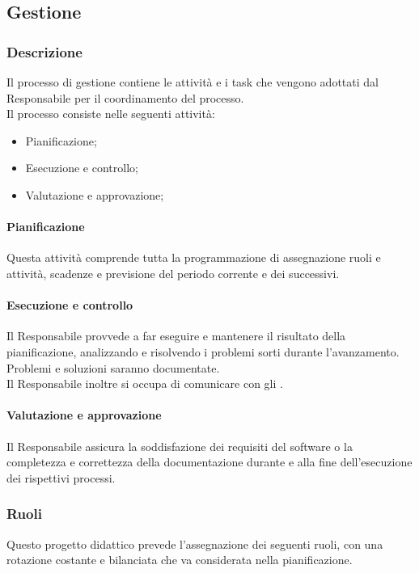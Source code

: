 \subsection{Gestione}

\subsubsection{Descrizione}
Il processo di gestione contiene le attività e i task che vengono adottati dal Responsabile per il coordinamento del processo.\\
Il processo consiste nelle seguenti attività:
\begin{itemize}
  \item Pianificazione;
  \item Esecuzione e controllo;
  \item Valutazione e approvazione;
\end{itemize}

\paragraph{Pianificazione}
Questa attività comprende tutta la programmazione di assegnazione ruoli e attività, scadenze e previsione del periodo corrente e dei successivi.

\paragraph{Esecuzione e controllo}
Il Responsabile provvede a far eseguire e mantenere il risultato della pianificazione, analizzando e risolvendo i problemi sorti durante l'avanzamento. Problemi e soluzioni saranno documentate.\\
Il Responsabile inoltre si occupa di comunicare con gli .

\paragraph{Valutazione e approvazione}
Il Responsabile assicura la soddisfazione dei requisiti del software o la completezza e correttezza della documentazione durante e alla fine dell'esecuzione dei rispettivi processi.

\subsubsection{Ruoli}
Questo progetto didattico prevede l'assegnazione dei seguenti ruoli, con una rotazione costante e bilanciata che va considerata nella pianificazione.

